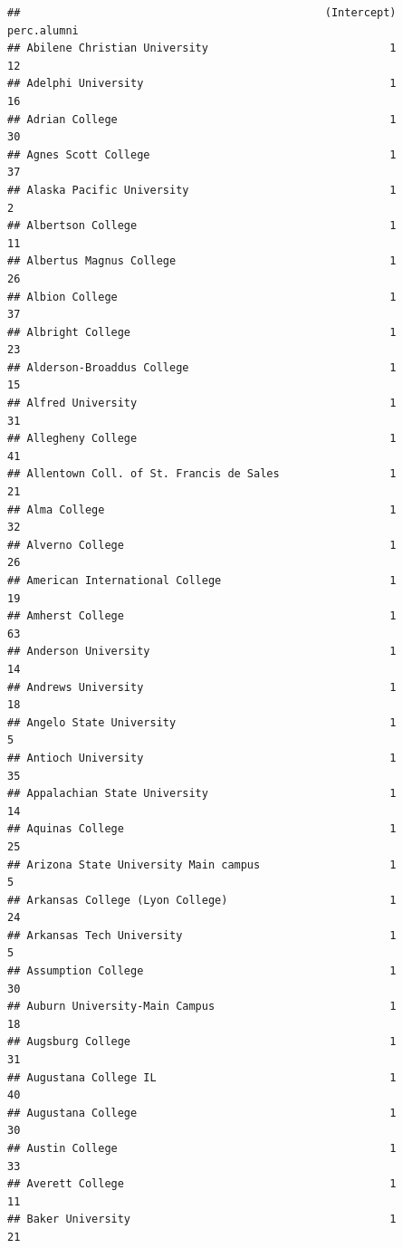 \documentclass[
]{article}
\begin{document}
\begin{verbatim}
##                                               (Intercept) perc.alumni
## Abilene Christian University                            1          12
## Adelphi University                                      1          16
## Adrian College                                          1          30
## Agnes Scott College                                     1          37
## Alaska Pacific University                               1           2
## Albertson College                                       1          11
## Albertus Magnus College                                 1          26
## Albion College                                          1          37
## Albright College                                        1          23
## Alderson-Broaddus College                               1          15
## Alfred University                                       1          31
## Allegheny College                                       1          41
## Allentown Coll. of St. Francis de Sales                 1          21
## Alma College                                            1          32
## Alverno College                                         1          26
## American International College                          1          19
## Amherst College                                         1          63
## Anderson University                                     1          14
## Andrews University                                      1          18
## Angelo State University                                 1           5
## Antioch University                                      1          35
## Appalachian State University                            1          14
## Aquinas College                                         1          25
## Arizona State University Main campus                    1           5
## Arkansas College (Lyon College)                         1          24
## Arkansas Tech University                                1           5
## Assumption College                                      1          30
## Auburn University-Main Campus                           1          18
## Augsburg College                                        1          31
## Augustana College IL                                    1          40
## Augustana College                                       1          30
## Austin College                                          1          33
## Averett College                                         1          11
## Baker University                                        1          21

\end{verbatim}
\end{document}
